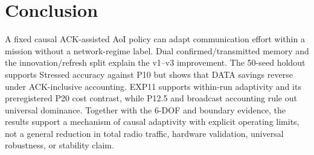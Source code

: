 \section{Conclusion}
\label{sec:conclusion}

A fixed causal ACK-assisted AoI policy can adapt communication effort within a
mission without a network-regime label. Dual confirmed/transmitted memory and
the innovation/refresh split explain the v1--v3 improvement. The 50-seed
holdout supports Stressed accuracy against P10 but shows that DATA savings
reverse under ACK-inclusive accounting. EXP11 supports within-run adaptivity
and its preregistered P20 cost contrast, while P12.5 and broadcast accounting
rule out universal dominance. Together with the 6-DOF and boundary evidence,
the results support a mechanism of causal adaptivity with explicit operating
limits, not a general reduction in total radio traffic, hardware validation,
universal robustness, or stability claim.
